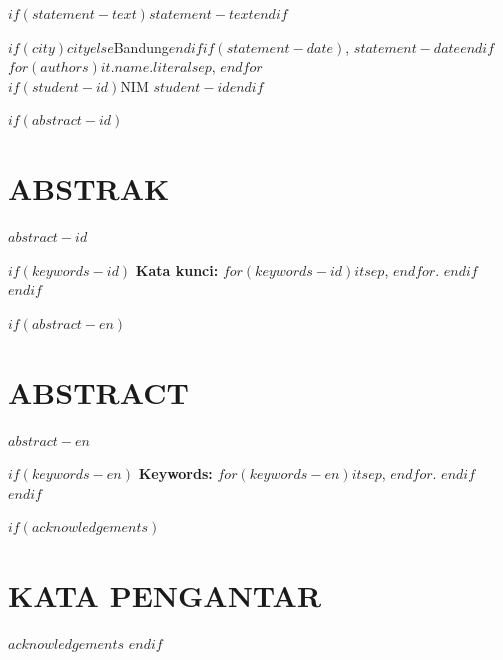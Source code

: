 $if(statement-text)$$statement-text$$endif$

\vspace{15mm}
$if(city)$$city$$else$Bandung$endif$$if(statement-date)$, $statement-date$$endif$\\
$for(authors)$$it.name.literal$$sep$, $endfor$\\
$if(student-id)$NIM $student-id$$endif$
\clearpage

$if(abstract-id)$
\chapter*{ABSTRAK}
$abstract-id$

$if(keywords-id)$
\medskip
\noindent\textbf{Kata kunci:} $for(keywords-id)$$it$$sep$, $endfor$.
$endif$
\clearpage
$endif$

$if(abstract-en)$
\chapter*{ABSTRACT}
$abstract-en$

$if(keywords-en)$
\medskip
\noindent\textbf{Keywords:} $for(keywords-en)$$it$$sep$, $endfor$.
$endif$
\clearpage
$endif$

$if(acknowledgements)$
\chapter*{KATA PENGANTAR}
$acknowledgements$
\clearpage
$endif$

\pagestyle{plain}
